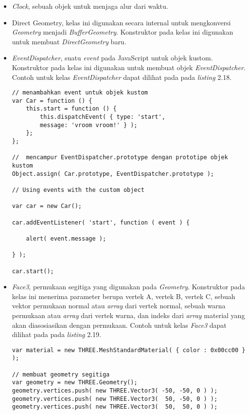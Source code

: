 \begin{itemize}
\begin{itemize}
	\item{\it Clock}, sebuah objek untuk menjaga alur dari waktu.
	\item{Direct Geometry}, kelas ini digunakan secara internal untuk mengkonversi {\it Geometry} menjadi {\it BufferGeometry}. Konstruktor pada kelas ini digunakan untuk membuat {\it DirectGeometry} baru.
	\item{\it EventDispatcher}, suatu {\it event} pada JavaScript untuk objek kustom. Konstruktor pada kelas ini digunakan untuk membuat objek {\it EventDispatcher}. Contoh untuk kelas {\it EventDispatcher} dapat dilihat pada pada {\it listing} 2.18.
\begin{lstlisting}[caption={Contoh penggunaan objek {\it EventDispatcher} untuk objek kustom.},captionpos=b]
// menambahkan event untuk objek kustom
var Car = function () {
    this.start = function () {
        this.dispatchEvent( { type: 'start',
        message: 'vroom vroom!' } );
    };
};

//  mencampur EventDispatcher.prototype dengan prototipe objek kustom
Object.assign( Car.prototype, EventDispatcher.prototype );

// Using events with the custom object

var car = new Car();

car.addEventListener( 'start', function ( event ) {

    alert( event.message );

} );

car.start();
\end{lstlisting}

	\item{\it Face3}, permukaan segitiga yang digunakan pada {\it Geometry}. Konstruktor pada kelas ini menerima parameter berupa vertek A, vertek B, vertek C, sebuah vektor permukaan normal atau {\it array} dari vertek normal, sebuah warna permukaan atau {\it array} dari vertek warna, dan indeks dari {\it array} material yang akan diasosiasikan dengan permukaan. Contoh untuk kelas {\it Face3} dapat dilihat pada pada {\it listing} 2.19.
\begin{lstlisting}[caption={Contoh penggunaan {\it Face3} pada suatu {\it Geometry}.},captionpos=b]
var material = new THREE.MeshStandardMaterial( { color : 0x00cc00 } );

// membuat geometry segitiga
var geometry = new THREE.Geometry();
geometry.vertices.push( new THREE.Vector3( -50, -50, 0 ) );
geometry.vertices.push( new THREE.Vector3(  50, -50, 0 ) );
geometry.vertices.push( new THREE.Vector3(  50,  50, 0 ) );


\end{lstlisting}
\end{itemize}
\end{itemize}
